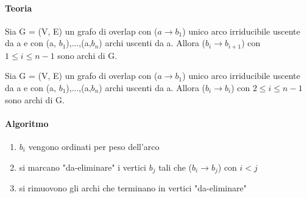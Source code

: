 \paragraph{Teoria}

Sia G = (V, E) un grafo di overlap con ($a \rightarrow b_1$) unico arco irriducibile uscente da a e con (a, $b_1$),...,(a,$b_n$) archi uscenti da a. Allora ($b_i \rightarrow b_{i+1}$) con $1 \leq i \leq n-1$ sono archi di G.

Sia G = (V, E) un grafo di overlap con ($a \rightarrow b_1$) unico arco irriducibile uscente da a e con (a, $b_1$),...,(a,$b_n$) archi uscenti da a. Allora ($b_i \rightarrow b_i$) con $2 \leq i \leq n-1$ sono archi di G.

\paragraph{Algoritmo}

\begin{enumerate}
  \item $b_i$ vengono ordinati per peso dell'arco
  \item si marcano "da-eliminare" i vertici $b_j$ tali che ($b_i \rightarrow b_j$) con $i<j$
  \item si rimuovono gli archi che terminano in vertici "da-eliminare"
\end{enumerate}

